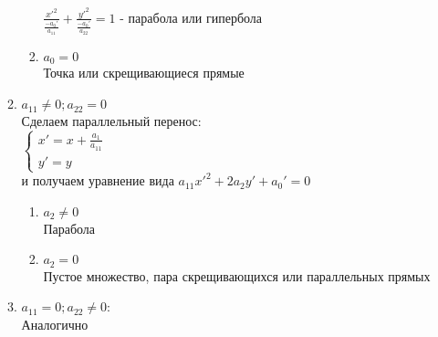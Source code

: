 \documentclass[12pt]{article}
\begin{document}
\begin{enumerate}
\begin{enumerate}
\begin{enumerate}
                $\frac{x'^2}{\frac{-a_0'}{a_{11}}}+\frac{y'^2}{\frac{-a_0'}{a_{22}}} = 1$ - парабола или гипербола
                \item $a_0 = 0$\\
                Точка или скрещивающиеся прямые
            \end{enumerate}
            \item $a_{11} \neq 0; a_{22} = 0$\\
             Сделаем параллельный перенос:\\
             $\left\{\begin{array}{l}
              x' = x + \frac{a_1}{a_{11}}\\
              y' = y
            \end{array}\right.$\\
            и получаем уравнение вида $a_{11}x'^2+2a_{2}y'+a_0'=0$
            \begin{enumerate}
                \item $a_2\neq 0$\\
                Парабола
                \item $a_2=0$\\
                Пустое множество, пара скрещивающихся или параллельных прямых
            \end{enumerate}
            \item $a_{11} = 0; a_{22}\neq0$:\\
            Аналогично
        \end{enumerate}
    \end{enumerate}
\end{document}
